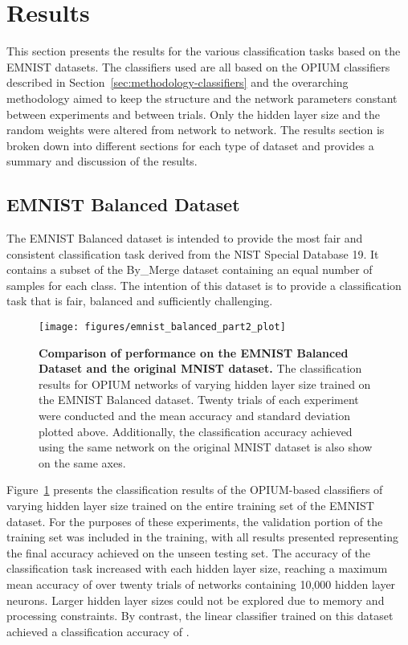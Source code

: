 \documentclass[conference]{IEEEtran}
\begin{document}
\section{Results}
\label{sec:results}

This section presents the results for the various classification tasks based on the EMNIST datasets. The classifiers used are all based on the OPIUM classifiers described in Section~\ref{sec:methodology-classifiers} and the overarching methodology aimed to keep the structure and the network parameters constant between experiments and between trials. Only the hidden layer size and the random weights were altered from network to network. The results section is broken down into different sections for each type of dataset and provides a summary and discussion of the results. 

\subsection{EMNIST Balanced Dataset}
\label{sec:results-balanced}

The EMNIST Balanced dataset is intended to provide the most fair and consistent classification task derived from the NIST Special Database 19. It contains a subset of the By\_Merge dataset containing an equal number of samples for each class. The intention of this dataset is to provide a classification task that is fair, balanced and sufficiently challenging. 

\begin{figure}
  \centering
  \texttt{[image: figures/emnist\_balanced\_part2\_plot]}
  \caption{\textbf{Comparison of performance on the EMNIST Balanced Dataset and the original MNIST dataset.} The classification results for OPIUM networks of varying hidden layer size trained on the EMNIST Balanced dataset. Twenty trials of each experiment were conducted and the mean accuracy and standard deviation plotted above. Additionally, the classification accuracy achieved using the same network on the original MNIST dataset is also show on the same axes.}
  \label{fig:results-emnist-balanced}
\end{figure}

Figure~\ref{fig:results-emnist-balanced} presents the classification results of the OPIUM-based classifiers of varying hidden layer size trained on the entire training set of the EMNIST dataset. For the purposes of these experiments, the validation portion of the training set was included in the training, with all results presented representing the final accuracy achieved on the unseen testing set. The accuracy of the classification task increased with each hidden layer size, reaching a maximum mean accuracy of  over twenty trials of networks containing 10,000 hidden layer neurons. Larger hidden layer sizes could not be explored due to memory and processing constraints. By contrast, the linear classifier trained on this dataset achieved a classification accuracy of .
\end{document}
